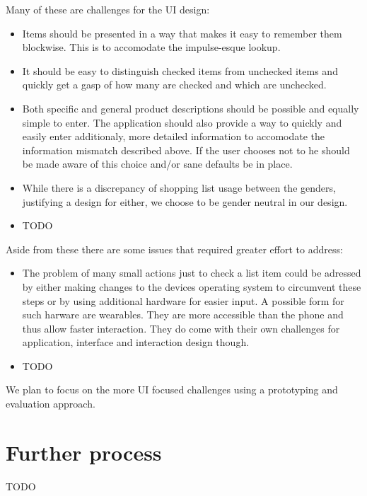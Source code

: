 \documentclass{scrartcl}
\begin{document}
Many of these are challenges for the UI design:
\begin{itemize}
  \item Items should be presented in a way that makes it easy to remember them blockwise. This is to accomodate the impulse-esque lookup.
  \item It should be easy to distinguish checked items from unchecked items and quickly get a gasp of how many are checked and which are unchecked.
  \item Both specific and general product descriptions should be possible and equally simple to enter. 
    The application should also provide a way to quickly and easily enter additionaly, more detailed information to accomodate the information mismatch described above.
    If the user chooses not to he should be made aware of this choice and/or sane defaults be in place.
  \item While there is a discrepancy of shopping list usage between the genders, justifying a design for either, we choose to be gender neutral in our design. 
  \item TODO
\end{itemize}

Aside from these there are some issues that required greater effort to address:
\begin{itemize}
  \item The problem of many small actions just to check a list item could be adressed by either making changes to the devices operating system to circumvent these steps or by using additional hardware for easier input.
    A possible form for such harware are wearables. They are more accessible than the phone and thus allow faster interaction. 
    They do come with their own challenges for application, interface and interaction design though.
  \item TODO 
\end{itemize}

We plan to focus on the more UI focused challenges using a prototyping and evaluation approach.

\section{Further process}
\label{sec:process}
TODO
\end{document}
